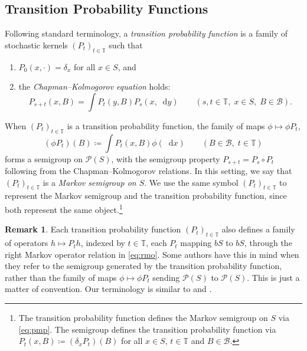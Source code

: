\documentclass[12pt,reqno]{amsart}
\numberwithin{equation}{section}
\theoremstyle{definition}
\newtheorem{remark}{Remark}[section]
\newcommand{\1}{\mathbbm{1}}
\newcommand{\diff}{\mathop{}\!\mathrm{d}}
\newcommand{\TT}{\mathbb T}
\newcommand{\bB}{\mathscr{B}}
\newcommand{\pP}{\mathscr{P}}
\newcommand{\navy}[1]{\textit{\textcolor{blue!40!black}{#1}}}
\begin{document}
\subsection{Transition Probability Functions}

Following standard terminology, a \navy{transition probability function} is a
family of stochastic kernels $(P_t)_{t \in \TT}$ such that 
%
\begin{enumerate}
    \item $P_0(x, \cdot) = \delta_x$ for all $x \in S$, and
    \item the \navy{Chapman--Kolmogorov equation} holds:
        \begin{equation}\label{eq:ck}
            P_{s + t}(x, B) = \int P_t(y, B) P_s(x, \diff y)
            \qquad (s, t \in \TT, \; x \in S, \; B \in \bB).
        \end{equation}
\end{enumerate}
%
When $(P_t)_{t \in \TT}$ is a transition probability function, the family of maps 
$\phi \mapsto \phi P_t$,
%
\begin{equation}\label{eq:pmp}
    (\phi P_t) (B)  \coloneq \int P_t(x,B) \phi(\diff x) 
    \qquad (B \in \bB, \; t \in \TT)
\end{equation}
%
forms a semigroup on $\pP(S)$, with the semigroup property
$P_{s + t} = P_s \circ P_t$ following from the Chapman--Kolmogorov relations.
In this setting, we say that $(P_t)_{t \in \TT}$ is a \navy{Markov semigroup on
$S$}. We use the same symbol $(P_t)_{t \in \TT}$ to represent the Markov semigroup and the transition probability
function, since both represent the same object.\footnote{The transition
probability function defines the Markov semigroup on $S$ via \eqref{eq:pmp}.
The semigroup defines the transition probability function via
$P_t(x, B) \coloneq (\delta_x P_t)(B)$ for all $x \in S$, $t \in \TT$ and $B \in \bB$.}

\begin{remark}\label{r:sgn}
    Each transition probability function $(P_t)_{t \in \TT}$ also defines a
    family of operators $h \mapsto P_t h$, indexed by $t \in \TT$, each $P_t$
    mapping $bS$ to $bS$, through the
    right Markov operator relation in \eqref{eq:rmo}.  Some authors have this in
    mind when they refer to the semigroup generated by the transition
    probability function, rather than the family of maps $\phi \mapsto \phi
    P_t$ sending $\pP(S)$ to $\pP(S)$.  This is just a matter of convention.
    Our terminology is similar to \cite{LasotaMackey1994} and \cite{rudnicki2017piecewise}.
\end{remark}
\end{document}
